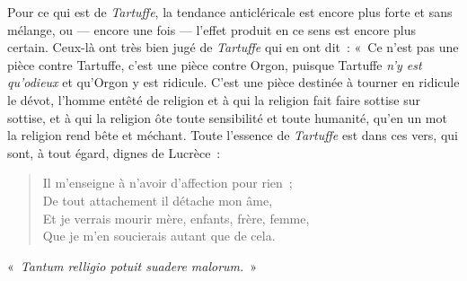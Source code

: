 \documentclass[french,twoside]{book} %
\newenvironment{quoteblock}%
  {\begin{quoting}}
  {\end{quoting}}
\newenvironment{quotebar}{%
    \def\FrameCommand{{\color{rubric!10!}\vrule width 0.5em} \hspace{0.9em}}%
    \def\OuterFrameSep{\itemsep} %
    \MakeFramed {\advance\hsize-\width \FrameRestore}
  }%
  {%
    \endMakeFramed
  }
\renewenvironment{quoteblock}%
  {%
    \savenotes
    \setstretch{0.9}
    \normalfont
    \begin{quotebar}
  }
  {%
    \end{quotebar}
    \spewnotes
  }
\begin{document}
Pour ce qui est de \emph{Tartuffe}, la tendance anticléricale est encore plus forte et sans mélange,  ou — encore une fois — l’effet produit en ce sens est encore plus certain. Ceux-là ont très bien jugé de \emph{Tartuffe} qui en ont dit : « Ce n’est pas une pièce contre Tartuffe, c’est une pièce contre Orgon, puisque Tartuffe {\itshape n’y est qu’odieux} et qu’Orgon y est ridicule. C’est une pièce destinée à tourner en ridicule le dévot, l’homme entêté de religion et à qui la religion fait faire sottise sur sottise, et à qui la religion ôte toute sensibilité et toute humanité, qu’en un mot la religion rend bête et méchant. Toute l’essence de \emph{Tartuffe} est dans ces vers, qui sont, à tout égard, dignes de Lucrèce :\par


\begin{verse}
Il m’enseigne à n’avoir d’affection pour rien ;\\
De tout attachement il détache mon âme,\\
Et je verrais mourir mère, enfants, frère, femme,\\
Que je m’en soucierais autant que de cela.\\
\end{verse}


\begin{quoteblock}
\noindent « {\itshape Tantum relligio potuit suadere malorum.} »
\end{quoteblock}
\end{document}
